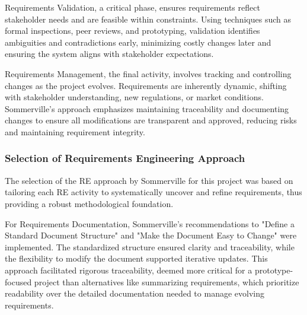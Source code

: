 Requirements Validation, a critical phase, ensures requirements reflect stakeholder needs and are feasible within
constraints. Using techniques such as formal inspections, peer reviews, and prototyping, validation identifies
ambiguities and contradictions early, minimizing costly changes later and ensuring the system aligns with stakeholder
expectations.\autocite[cf.][p.190--191]{sommervilleRequirementsEngineeringGood1997}

Requirements Management, the final activity, involves tracking and controlling changes as the project evolves.
Requirements are inherently dynamic, shifting with stakeholder understanding, new regulations, or market conditions.
Sommerville’s approach emphasizes maintaining traceability and documenting changes to ensure all modifications are
transparent and approved, reducing risks and maintaining requirement integrity.
\autocite[cf.][p.216--217]{sommervilleRequirementsEngineeringGood1997}

\subsubsection{Selection of Requirements Engineering Approach}

The selection of the \acs{RE} approach by Sommerville for this project was based on
tailoring each \acs{RE} activity to systematically uncover and refine requirements, thus providing a robust
methodological foundation.

For Requirements Documentation, Sommerville’s recommendations to "Define a Standard Document Structure" and "Make the
Document Easy to Change" were implemented. The standardized structure ensured clarity and traceability, while the
flexibility to modify the document supported iterative updates.
\autocite[cf.][p.41]{sommervilleRequirementsEngineeringGood1997}
\autocite[cf.][p.60]{sommervilleRequirementsEngineeringGood1997} This approach facilitated rigorous traceability, deemed
more critical for a prototype-focused project than alternatives like summarizing requirements, which prioritize
readability over the detailed documentation needed to manage evolving requirements.
\autocite[cf.][p.47]{sommervilleRequirementsEngineeringGood1997}

